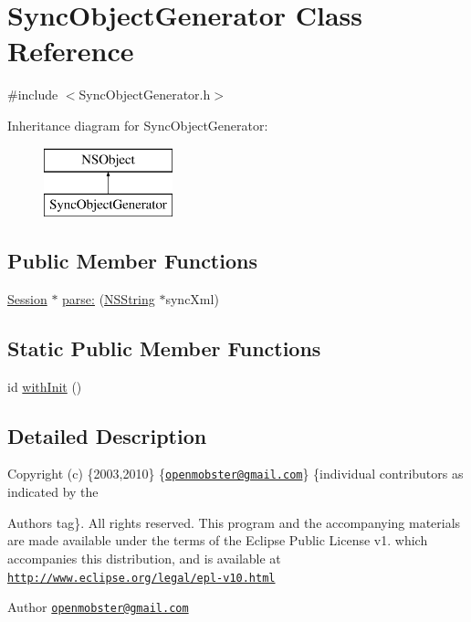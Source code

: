 \hypertarget{interface_sync_object_generator}{
\section{\-Sync\-Object\-Generator \-Class \-Reference}
\label{interface_sync_object_generator}
}


{\ttfamily \#include $<$\-Sync\-Object\-Generator.\-h$>$}

\-Inheritance diagram for \-Sync\-Object\-Generator\-:\begin{figure}[H]
\begin{center}
\leavevmode
\includegraphics[height=2.000000cm]{interface_sync_object_generator}
\end{center}
\end{figure}
\subsection*{\-Public \-Member \-Functions}
\begin{DoxyCompactItemize}
\item 
\hyperlink{interface_session}{\-Session} $\ast$ \hyperlink{interface_sync_object_generator_a5cfe911e5218a8d0030e26249b29ea9b}{parse\-:} (\hyperlink{class_n_s_string}{\-N\-S\-String} $\ast$sync\-Xml)
\end{DoxyCompactItemize}
\subsection*{\-Static \-Public \-Member \-Functions}
\begin{DoxyCompactItemize}
\item 
id \hyperlink{interface_sync_object_generator_aa1d5958a60931cc3f8ed745eb4d6497c}{with\-Init} ()
\end{DoxyCompactItemize}


\subsection{\-Detailed \-Description}
\-Copyright (c) \{2003,2010\} \{\href{mailto:openmobster@gmail.com}{\tt openmobster@gmail.\-com}\} \{individual contributors as indicated by the \begin{DoxyAuthor}{\-Authors}
tag\}. \-All rights reserved. \-This program and the accompanying materials are made available under the terms of the \-Eclipse \-Public \-License v1. which accompanies this distribution, and is available at \href{http://www.eclipse.org/legal/epl-v10.html}{\tt http\-://www.\-eclipse.\-org/legal/epl-\/v10.\-html}
\end{DoxyAuthor}
\begin{DoxyAuthor}{\-Author}
\href{mailto:openmobster@gmail.com}{\tt openmobster@gmail.\-com} 
\end{DoxyAuthor}


